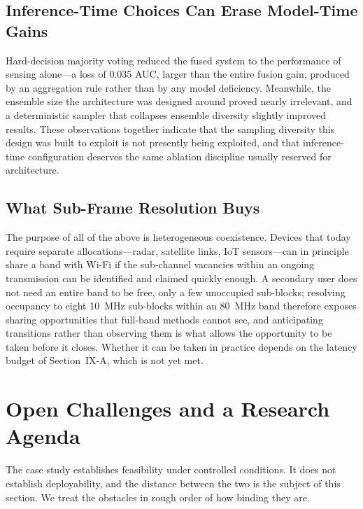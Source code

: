 \documentclass[lettersize,journal]{IEEEtran}
\begin{document}
\subsection{\textbf{Inference-Time Choices Can Erase Model-Time Gains}}
Hard-decision majority voting reduced the fused system to the
performance of sensing alone---a loss of 0.035 AUC, larger than the
entire fusion gain, produced by an aggregation rule rather than by any
model deficiency. Meanwhile, the ensemble size the architecture was
designed around proved nearly irrelevant, and a deterministic sampler
that collapses ensemble diversity slightly improved results. These
observations together indicate that the sampling diversity this design
was built to exploit is not presently being exploited, and that
inference-time configuration deserves the same ablation discipline
usually reserved for architecture.

\subsection{\textbf{What Sub-Frame Resolution Buys}}
The purpose of all of the above is heterogeneous coexistence. Devices that
today require separate allocations---radar, satellite links, IoT sensors---can
in principle share a band with Wi-Fi if the sub-channel vacancies within an
ongoing transmission can be identified and claimed quickly enough. A secondary
user does not need an entire band to be free, only a few unoccupied
sub-blocks; resolving occupancy to eight 10~MHz sub-blocks within an 80~MHz
band therefore exposes sharing opportunities that full-band methods cannot see,
and anticipating transitions rather than observing them is what allows the
opportunity to be taken before it closes. Whether it can be taken in practice
depends on the latency budget of Section~IX-A, which is not yet met.

\section{\textbf{Open Challenges and a Research Agenda}}

The case study establishes feasibility under controlled conditions. It
does not establish deployability, and the distance between the two is the
subject of this section. We treat the obstacles in rough order of how
binding they are.
\end{document}
